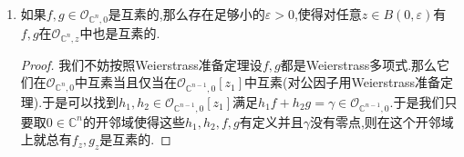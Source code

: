\begin{enumerate}
\begin{enumerate}[(1)]
\begin{proof}
    		按照Weierstrass多项式,不妨设$f\in\mathscr{O}_{\mathbb{C}^{n-1},0}[z_1]$是Weierstrass多项式.假设$f$作为$\mathscr{O}_{\mathbb{C}^n,z}$中的元是可约的,那么有分解$f=f_1f_2$,其中$f_1,f_2$都是$\mathscr{O}_{\mathbb{C}^n,z}$中的非单位,换句话讲有$f_1(z)=f_2(z)=0$.那么有$\frac{\partial f}{\partial z_1}(z)=0$.于是$B(0,\varepsilon)$中满足$f$在$\mathscr{O}_{\mathbb{C}^n,z}$中可约的点$z$构成的集合是落在$Z(f,\frac{\partial f}{\partial z_1})$中.这是一个不包含原点的闭子集,于是可以找到原点的开邻域和它不交,于是在这个开邻域上的$z$总有$f\in\mathscr{O}_{\mathbb{C}^n,z}$是不可约的.
    	\end{proof}
        \item 如果$f,g\in\mathscr{O}_{\mathbb{C}^n,0}$是互素的,那么存在足够小的$\varepsilon>0$,使得对任意$z\in B(0,\varepsilon)$有$f,g$在$\mathscr{O}_{\mathbb{C}^n,z}$中也是互素的.
        \begin{proof}
        	
        	我们不妨按照Weierstrass准备定理设$f,g$都是Weierstrass多项式.那么它们在$\mathscr{O}_{\mathbb{C}^n,0}$中互素当且仅当在$\mathscr{O}_{\mathbb{C}^{n-1},0}[z_1]$中互素(对公因子用Weierstrass准备定理).于是可以找到$h_1,h_2\in\mathscr{O}_{\mathbb{C}^{n-1},0}[z_1]$满足$h_1f+h_2g=\gamma\in\mathscr{O}_{\mathbb{C}^{n-1},0}$.于是我们只要取$0\in\mathbb{C}^n$的开邻域使得这些$h_1,h_2,f,g$有定义并且$\gamma$没有零点,则在这个开邻域上就总有$f_z,g_z$是互素的.
        \end{proof}
    \end{enumerate}
\end{enumerate}
\newpage
